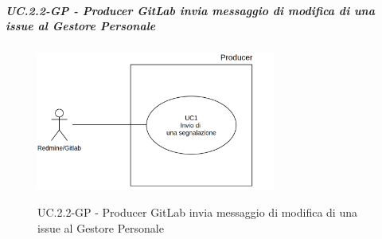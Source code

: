 		\subparagraph{UC\theuccount.2.2-GP - Producer GitLab invia messaggio di modifica di una issue al Gestore Personale}
		\begin{figure}[H]
			\centering
			\includegraphics[width=0.7\textwidth]{img/UC1.png}\\
			\caption{UC\theuccount.2.2-GP - Producer GitLab invia messaggio di modifica di una issue al Gestore Personale}
		\end{figure}
